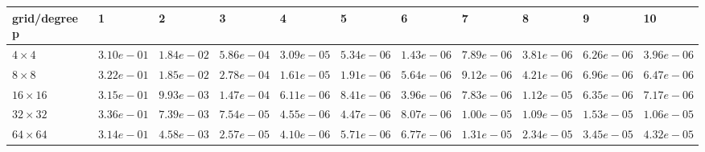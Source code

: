 \begin{tabular}{lllllllllll}
\hline
 grid/degree p   & 1          & 2          & 3          & 4          & 5          & 6          & 7          & 8          & 9          & 10         \\
\hline
 $4 \times 4$    & $3.10e-01$ & $1.84e-02$ & $5.86e-04$ & $3.09e-05$ & $5.34e-06$ & $1.43e-06$ & $7.89e-06$ & $3.81e-06$ & $6.26e-06$ & $3.96e-06$ \\
 $8 \times 8$    & $3.22e-01$ & $1.85e-02$ & $2.78e-04$ & $1.61e-05$ & $1.91e-06$ & $5.64e-06$ & $9.12e-06$ & $4.21e-06$ & $6.96e-06$ & $6.47e-06$ \\
 $16 \times 16$  & $3.15e-01$ & $9.93e-03$ & $1.47e-04$ & $6.11e-06$ & $8.41e-06$ & $3.96e-06$ & $7.83e-06$ & $1.12e-05$ & $6.35e-06$ & $7.17e-06$ \\
 $32 \times 32$  & $3.36e-01$ & $7.39e-03$ & $7.54e-05$ & $4.55e-06$ & $4.47e-06$ & $8.07e-06$ & $1.00e-05$ & $1.09e-05$ & $1.53e-05$ & $1.06e-05$ \\
 $64 \times 64$  & $3.14e-01$ & $4.58e-03$ & $2.57e-05$ & $4.10e-06$ & $5.71e-06$ & $6.77e-06$ & $1.31e-05$ & $2.34e-05$ & $3.45e-05$ & $4.32e-05$ \\
\hline
\end{tabular}
